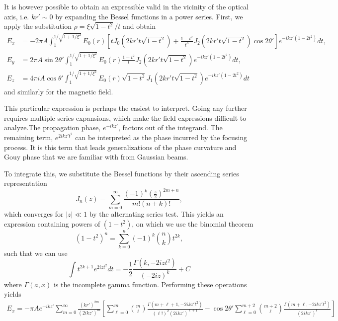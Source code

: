\documentclass[11pt,SymmetricalJury]{inrsthesis/inrsthesis}
\begin{document}
It is however possible to obtain an expressible valid in the vicinity of the
optical axis, i.e. $kr'\sim0$ by expanding the Bessel functions in a power series.
First, we apply the substitution $\rho=\xi\sqrt{1-t^2}/t$ and obtain
  \begin{subequations}
  \begin{align}
    E_x      &= -2\pi A\int_1^{1/\sqrt{1+1/\xi^2}}E_0(r)
        \left[tJ_0\left(2kr't\sqrt{1-t^2}\right)
              +\frac{1-t^2}{t^3}J_2\left(2kr't\sqrt{1-t^2}\right)\cos2\theta'
        \right]
        e^{-ikz'(1-2t^2)} dt, \\
    E_y     &= 2\pi A\sin2\theta'\int_1^{1/\sqrt{1+1/\xi^2}}E_0(r)
        \frac{1-t^2}{t}J_2\left(2kr't\sqrt{1-t^2}\right)
        e^{-ikz'(1-2t^2)} dt, \\
    E_z     &= 4\pi iA\cos\theta'\int_1^{1/\sqrt{1+1/\xi^2}}E_0(r)
         \sqrt{1-t^2}J_1\left(2kr't\sqrt{1-t^2}\right)
        e^{-ikz'(1-2t^2)} dt
  \end{align}
  \end{subequations}
and similarly for the magnetic field.

This particular expression is perhaps the easiest to interpret. Going any further
requires multiple series expansions, which make the field expressions difficult
to analyze.The propagation phase, $e^{-ikz'}$, factors out of the integrand.
The remaining term, $e^{2ikz't^2}$ can be interpreted as the phase incurred
by the focusing process. It is this term that leads generalizations of the
phase curvature and Gouy phase that we are familiar with from Gaussian beams.

To integrate this, we substitute the Bessel functions by their ascending series
representation
\cite[\S9.1.10]{Abramowitz1965}
  \begin{equation}
    J_n(z) = \sum_{m=0}^\infty
      \frac{(-1)^k\left(\frac{z}{2}\right)^{2m+n}}{m!(n+k)!},
  \end{equation}
which converges for $|z|\ll1$ by the alternating series test. This yields
an expression containing powers of $(1-t^2)$, on which we use the binomial
theorem
  \begin{equation}
    (1-t^2)^n = \sum_{k=0}^n (-1)^k\binom{n}{k} t^{2k},
  \end{equation}
such that we can use
  \begin{equation}
    \int t^{2k+1}e^{2izt^2}dt = -\frac{1}{2}\frac{\Gamma(k,-2izt^2)}{(-2iz)^k} +C
  \end{equation}
where $\Gamma(a,x)$ is the incomplete gamma function. Performing these operations
yields
  \begin{subequations}
  \begin{align}
    E_x = -\pi Ae^{-ikz'}\sum_{m=0}^\infty\frac{(kr')^{2m}}{(2ikz')^{m}}
      \left[\sum_{\ell=0}^m\binom{m}{\ell}\frac{\Gamma(m+\ell+1,-2ikz't^2)}{(\ell!)^2(2ikz')^{\ell+1}}
           -\cos2\theta'\sum_{\ell=0}^{m+2}\binom{m+2}{\ell}\frac{\Gamma(m+\ell,-2ikz't^2)}{(2ikz')^\ell}\right]
  \end{align}
  \end{subequations}
\end{document}
